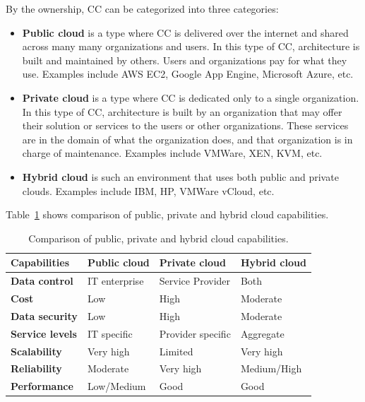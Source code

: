 By the ownership, CC can be categorized into three categories:

\begin{itemize}
	\item \textbf{Public cloud} is a type where CC is delivered over the internet and shared across many many organizations and users. In this type of CC, architecture is built and maintained by others. Users and organizations pay for what they use. Examples include AWS EC2, Google App Engine, Microsoft Azure, etc.
	\item \textbf{Private cloud} is a type where CC is dedicated only to a single organization. In this type of CC, architecture is built by an organization that may offer their solution or services to the users or other organizations. These services are in the domain of what the organization does, and that organization is in charge of maintenance. Examples include VMWare, XEN, KVM, etc.
	\item \textbf{Hybrid cloud} is such an environment that uses both public and private clouds. Examples include IBM, HP, VMWare vCloud, etc.
\end{itemize}

\noindent
Table~\ref{tab:table4} shows comparison of public, private and hybrid cloud capabilities.\label{sec_types}

\begin{table}[h!]
	\begin{center}
		\begin{tabular}{l|l|l|l}
			\textbf{Capabilities} & \textbf{Public cloud} & \textbf{Private cloud} & \textbf{Hybrid cloud}\\
			\hline
			\textbf{Data control} & IT enterprise & Service Provider & Both \\
			\textbf{Cost} & Low & High & Moderate \\
			\textbf{Data security} & Low & High & Moderate \\
			\textbf{Service levels} & IT specific & Provider specific & Aggregate \\
			\textbf{Scalability} & Very high & Limited & Very high \\	
			\textbf{Reliability} & Moderate & Very high & Medium/High\\	
			\textbf{Performance} & Low/Medium & Good & Good \\
		\end{tabular}
	\end{center}
	\vspace{-0.5cm}
	\caption{Comparison of public, private and hybrid cloud capabilities.}
	\label{tab:table4}
\end{table}

